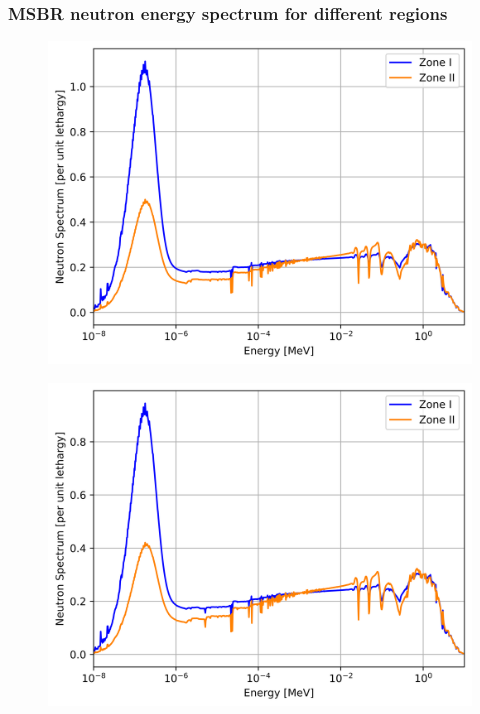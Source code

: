 \documentclass[9pt,handout]{beamer}
\begin{document}
\begin{frame}
  \frametitle{\gls{MSBR} neutron energy spectrum for different regions}
               \begin{figure}[t]
                \vspace*{-0.1in}
                \includegraphics[height=0.35\textwidth]{./images/spectrum_zones_init.png}
               \end{figure}
               \begin{figure}[t]
                \vspace*{-0.1in}
                \includegraphics[height=0.35\textwidth]{./images/spectrum_zones_eq.png}
               \end{figure}
              
\end{frame}
\end{document}
